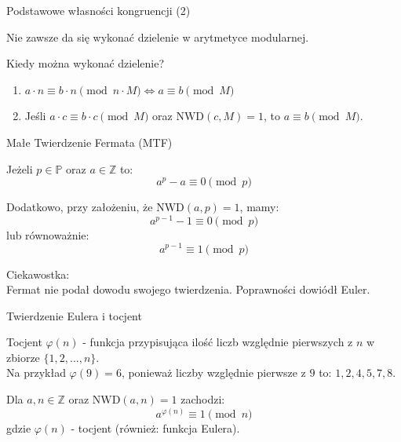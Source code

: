 \documentclass[polish,envcountsect,10pt]{beamer}
\begin{document}
\begin{frame}{Podstawowe własności kongruencji (2)}
    \begin{theorem}
    Nie zawsze da się wykonać dzielenie w arytmetyce modularnej.
    \end{theorem}

    Kiedy można wykonać dzielenie?
    \begin{enumerate}
        \item $a\cdot n \equiv b\cdot n \pmod{n\cdot M} \Leftrightarrow a \equiv b \pmod{M}$
        \item Jeśli $a\cdot c \equiv b\cdot c \pmod{M}$ oraz $\text{NWD}(c, M) = 1$, to $a \equiv b \pmod{M}$.
    \end{enumerate}

\end{frame}
%   


\begin{frame}{Małe Twierdzenie Fermata (MTF)}
    \begin{theorem}
    Jeżeli $p \in \mathbb{P}$ oraz $a \in \mathbb{Z}$ to: 
    \[ a^p - a \equiv 0 \pmod{p} \]
    \end{theorem}

    Dodatkowo, przy założeniu, że $\text{NWD}(a, p) = 1$, mamy:
    \[ a^{p-1} - 1 \equiv 0 \pmod{p} \]
    lub równoważnie:
    \[ a^{p - 1} \equiv 1 \pmod{p} \]

    Ciekawostka: \\
    Fermat nie podał dowodu swojego twierdzenia. Poprawności dowiódł Euler.
\end{frame}
%   


\begin{frame}{Twierdzenie Eulera i tocjent}
    \begin{definition}
    Tocjent $\varphi(n)$ - funkcja przypisująca ilość liczb względnie pierwszych z $n$ w zbiorze $\{1, 2, \ldots, n\}$.  
    \\
    Na przykład $\varphi(9) = 6$, ponieważ liczby względnie pierwsze z $9$ to: $1, 2, 4, 5, 7, 8$.
    \end{definition}
    
    \begin{theorem}
    Dla $a,n \in \mathbb{Z}$ oraz $\text{NWD}(a,n) = 1$ zachodzi:
    \[ a^{\varphi(n)} \equiv 1 \pmod{n} \]
    gdzie $\varphi(n)$ - tocjent (również: funkcja Eulera).
    \end{theorem}

\end{frame}
%  
\end{document}
